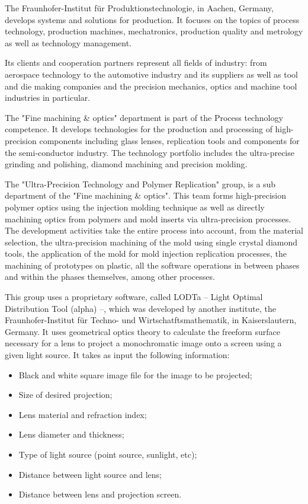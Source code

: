 	The Fraunhofer-Institut f\"ur Produktionstechnologie, in Aachen, Germany, develops systems and solutions for production. It focuses on the topics of process technology, production machines, mechatronics, production quality and metrology as well as technology management.

	Its clients and cooperation partners represent all fields of industry: from aerospace technology to the automotive industry and its suppliers as well as tool and die making companies and the precision mechanics, optics and machine tool industries in particular.
	
	The "Fine machining \& optics" department is part of the Process technology competence. It develops technologies for the production and processing of high-precision components including glass lenses, replication tools and components for the semi-conductor industry. The technology portfolio includes the ultra-precise grinding and polishing, diamond machining and precision molding.
	
	The "Ultra-Precision Technology and Polymer Replication" group, is a sub department of the "Fine machining \& optics". This team forms high-precision polymer optics using the injection molding technique as well as directly machining optics from polymers and mold inserts via ultra-precision processes. The development activities take the entire process into account, from the material selection, the ultra-precision machining of the mold using single crystal diamond tools, the application of the mold for mold injection replication processes, the machining of prototypes on plastic, all the software operations in between phases and within the phases themselves, among other processes.
	
	This group uses a proprietary software, called LODTa -- Light Optimal Distribution Tool (alpha) --, which was developed by another institute, the Fraunhofer-Institut f\"ur Techno- und Wirtschatftsmathematik, in Kaiserslautern, Germany. It uses geometrical optics theory to calculate the freeform surface necessary for a lens to project a monochromatic image onto a screen using a given light source. It takes as input the following information:
	\newpage
	
	\begin{itemize}
		\item Black and white square image file for the image to be projected;
		\item Size of desired projection;
		\item Lens material and refraction index;
		\item Lens diameter and thickness;
		\item Type of light source (point source, sunlight, etc);
		\item Distance between light source and lens;
		\item Distance between lens and projection screen.
	\end{itemize}
	

